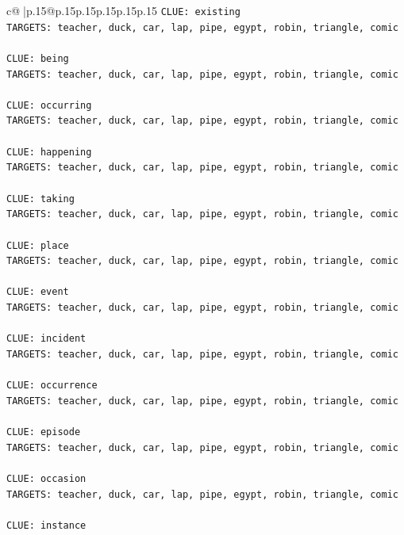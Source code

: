 \documentclass{article}
\begin{document}
{\begin{supertabular}{c@{$\;$}|p{.15\linewidth}@{}p{.15\linewidth}p{.15\linewidth}p{.15\linewidth}p{.15\linewidth}p{.15\linewidth}}
{{{\texttt{CLUE: existing} \\
\texttt{TARGETS: teacher, duck, car, lap, pipe, egypt, robin, triangle, comic} \\
\\ 
\texttt{CLUE: being} \\
\texttt{TARGETS: teacher, duck, car, lap, pipe, egypt, robin, triangle, comic} \\
\\ 
\texttt{CLUE: occurring} \\
\texttt{TARGETS: teacher, duck, car, lap, pipe, egypt, robin, triangle, comic} \\
\\ 
\texttt{CLUE: happening} \\
\texttt{TARGETS: teacher, duck, car, lap, pipe, egypt, robin, triangle, comic} \\
\\ 
\texttt{CLUE: taking} \\
\texttt{TARGETS: teacher, duck, car, lap, pipe, egypt, robin, triangle, comic} \\
\\ 
\texttt{CLUE: place} \\
\texttt{TARGETS: teacher, duck, car, lap, pipe, egypt, robin, triangle, comic} \\
\\ 
\texttt{CLUE: event} \\
\texttt{TARGETS: teacher, duck, car, lap, pipe, egypt, robin, triangle, comic} \\
\\ 
\texttt{CLUE: incident} \\
\texttt{TARGETS: teacher, duck, car, lap, pipe, egypt, robin, triangle, comic} \\
\\ 
\texttt{CLUE: occurrence} \\
\texttt{TARGETS: teacher, duck, car, lap, pipe, egypt, robin, triangle, comic} \\
\\ 
\texttt{CLUE: episode} \\
\texttt{TARGETS: teacher, duck, car, lap, pipe, egypt, robin, triangle, comic} \\
\\ 
\texttt{CLUE: occasion} \\
\texttt{TARGETS: teacher, duck, car, lap, pipe, egypt, robin, triangle, comic} \\
\\ 
\texttt{CLUE: instance} \\
}}}
\end{supertabular}}
\end{document}
